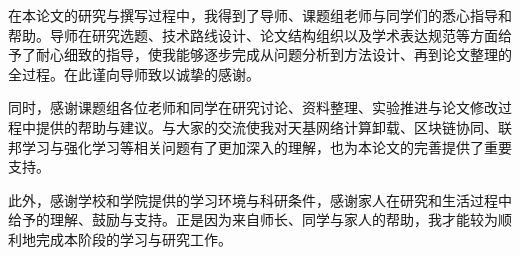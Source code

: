 
\begin{acknowledgements}

    在本论文的研究与撰写过程中，我得到了导师、课题组老师与同学们的悉心指导和帮助。导师在研究选题、技术路线设计、论文结构组织以及学术表达规范等方面给予了耐心细致的指导，使我能够逐步完成从问题分析到方法设计、再到论文整理的全过程。在此谨向导师致以诚挚的感谢。

    同时，感谢课题组各位老师和同学在研究讨论、资料整理、实验推进与论文修改过程中提供的帮助与建议。与大家的交流使我对天基网络计算卸载、区块链协同、联邦学习与强化学习等相关问题有了更加深入的理解，也为本论文的完善提供了重要支持。

    此外，感谢学校和学院提供的学习环境与科研条件，感谢家人在研究和生活过程中给予的理解、鼓励与支持。正是因为来自师长、同学与家人的帮助，我才能较为顺利地完成本阶段的学习与研究工作。

\end{acknowledgements}
